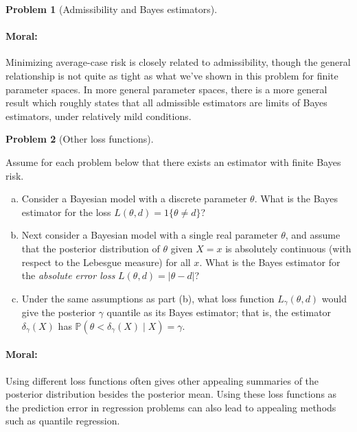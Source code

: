 \documentclass{article}
\newcommand{\PP}{\mathbb{P}}
\theoremstyle{definition}
\newtheorem{problem}{Problem}
\begin{document}
\begin{problem}[Admissibility and Bayes estimators]
\begin{enumerate}[(a)]
\end{enumerate}

\paragraph{Moral:} Minimizing average-case risk is closely related to admissibility, though the general relationship is not quite as tight as what we've shown in this problem for finite parameter spaces. In more general parameter spaces, there is a more general result which roughly states that all admissible estimators are limits of Bayes estimators, under relatively mild conditions.
\end{problem}






\begin{problem}[Other loss functions]
\label{prob:other-loss}

Assume for each problem below that there exists an estimator with finite Bayes risk.
\begin{enumerate}[(a)]
\item Consider a Bayesian model with a discrete parameter $\theta$. What is the Bayes estimator for the loss $L(\theta, d) = 1\{\theta \neq d\}$?




\item Next consider a Bayesian model with a single real parameter $\theta$, and assume that the posterior distribution of $\theta$ given $X=x$ is absolutely continuous (with respect to the Lebesgue measure) for all $x$. What is the Bayes estimator for the {\em absolute error loss} $L(\theta, d) = |\theta-d|$? 




\item Under the same assumptions as part (b), what loss function $L_\gamma(\theta, d)$ would give the posterior $\gamma$ quantile as its Bayes estimator; that is, the estimator $\delta_\gamma(X)$ has $\PP(\theta < \delta_\gamma(X) \mid X) = \gamma$.





\end{enumerate}

\paragraph{Moral:} Using different loss functions often gives other appealing summaries of the posterior distribution besides the posterior mean. Using these loss functions as the prediction error in regression problems can also lead to appealing methods such as quantile regression.

\end{problem}
\end{document}
